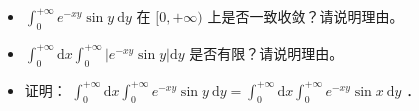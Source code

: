 \documentclass{article}
\begin{document}
\begin{itemize}
  \item[（1）] \(\int_{0}^{+\infty} e^{-x y} \sin y \mathrm{~d} y\) 在 \([0,+\infty)\) 上是否一致收敛？请说明理由。
  \item[（2）] \(\int_{0}^{+\infty} \mathrm{d} x \int_{0}^{+\infty}\left|e^{-x y} \sin y\right| \mathrm{d} y\) 是否有限？请说明理由。
  \item[（3）] 证明： \(\int_{0}^{+\infty} \mathrm{d} x \int_{0}^{+\infty} e^{-x y} \sin y \mathrm{~d} y=\int_{0}^{+\infty} \mathrm{d} x \int_{0}^{+\infty} e^{-x y} \sin x \mathrm{~d} y\) ．
\end{itemize}
\end{document}
